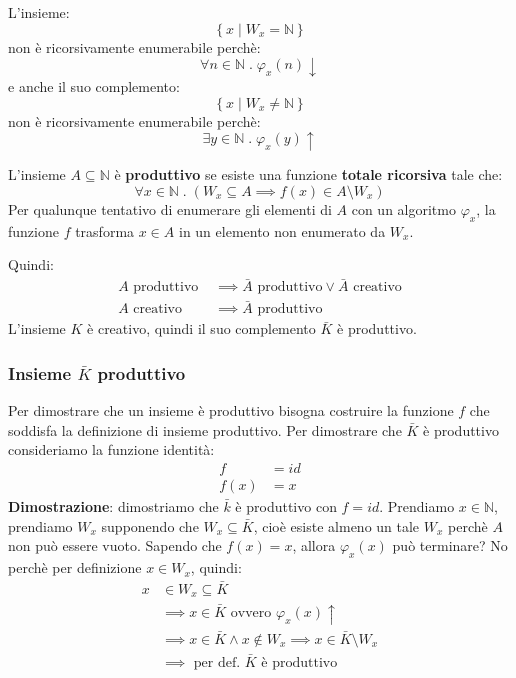 \documentclass[a4paper]{article}
\begin{document}
\begin{example}
  L'insieme:
  \[
    \left\{\left. x \;\right|\; W_x = \mathbb{N} \right\}
  \] 
  non è ricorsivamente enumerabile perchè:
  \[
    \forall n \in \mathbb{N} \;.\; \varphi_x(n) \downarrow
  \] 
  e anche il suo complemento:
  \[
    \left\{\left. x \;\right|\; W_x \neq \mathbb{N} \right\}
  \] 
  non è ricorsivamente enumerabile perchè:
  \[
    \exists y \in \mathbb{N} \;.\; \varphi_x(y) \uparrow
  \] 
\end{example}

\begin{definition}
  L'insieme \( A \subseteq \mathbb{N} \) è \textbf{produttivo} se esiste una
  funzione \textbf{totale ricorsiva} tale che:
  \[
    \forall x \in \mathbb{N} \;.\; \left( W_x \subseteq A \implies f(x) \in A \setminus W_x \right) 
  \] 
  Per qualunque tentativo di enumerare gli elementi di \( A \) con un algoritmo
  \( \varphi_x \), la funzione \( f \) trasforma \( x \in A \) in un elemento
  non enumerato da \( W_x \).
\end{definition}
Quindi:
\[
  \begin{aligned}
    A \text{ produttivo } &\implies \bar{A} \text{ produttivo} \vee \bar{A} \text{ creativo}\\
    A \text{ creativo } &\implies \bar{A} \text{ produttivo }
  \end{aligned}
\] 
L'insieme \( K \) è creativo, quindi il suo complemento \( \bar{K} \) è produttivo.

\subsubsection{Insieme \texorpdfstring{\( \bar{K} \)}{K} produttivo}
Per dimostrare che un insieme è produttivo bisogna costruire la funzione
\( f \) che soddisfa la definizione di insieme produttivo. Per dimostrare
che \( \bar{K} \) è produttivo consideriamo la funzione identità:
\[
  \begin{aligned}
    f &= id\\
    f(x) &= x
  \end{aligned}
\] 
\textbf{Dimostrazione}: dimostriamo che \( \bar{k} \) è produttivo con \( f = id \).
Prendiamo \( x \in \mathbb{N} \), prendiamo \( W_x \) supponendo che \( W_x \subseteq \bar{K} \),
cioè esiste almeno un tale \( W_x \) perchè \( A \) non può essere vuoto.
Sapendo che \( f(x) = x \), allora \( \varphi_x(x) \) può terminare?
No perchè per definizione \( x \in W_x  \), quindi:
\[
  \begin{aligned}
    x &\in W_x \subseteq \bar{K}\\
      &\implies x \in \bar{K} \text{ ovvero } \varphi_x(x) \uparrow\\
      &\implies x \in \bar{K} \land x \notin W_x \implies x \in \bar{K} \setminus W_x\\
      &\implies \text{ per def. } \bar{K} \text{ è produttivo}
  \end{aligned}
\] 
\end{document}
